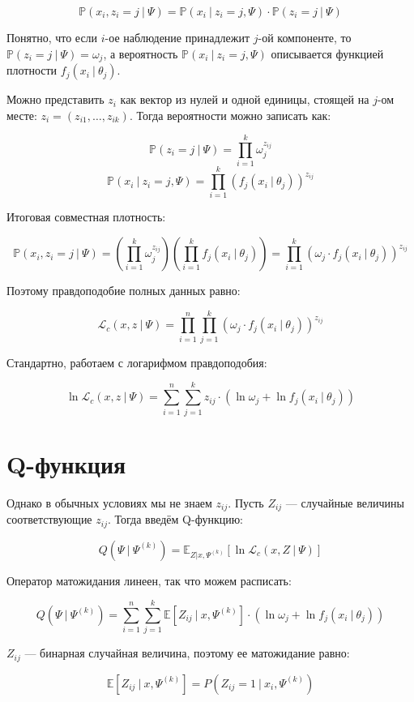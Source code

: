 \documentclass[14pt, a4paper, oneside]{memoir}
\begin{document}
\[\mathbb{P} (x_i, z_i = j ~|~ \Psi) = \mathbb{P}(x_i ~|~ z_i = j, \Psi) \cdot \mathbb{P}(z_i = j ~|~ \Psi)\]

Понятно, что если $i$-ое наблюдение принадлежит $j$-ой компоненте, то $\mathbb{P}(z_i = j ~|~ \Psi) = \omega_j$, а вероятность $\mathbb{P}(x_i~|~ z_i=j, \Psi)$ описывается функцией плотности $f_j(x_i~|~ \theta_j)$.

Можно представить $z_i$ как вектор из нулей и одной единицы, стоящей на $j$-ом месте: $z_i = (z_{i1}, \dots, z_{ik})$. Тогда вероятности можно записать как:

\[\mathbb{P}(z_i = j ~|~ \Psi) = \prod_{i=1}^k \omega_j^{z_{ij}}\]
\[\mathbb{P}(x_i ~|~ z_i = j, \Psi) = \prod_{i=1}^k (f_j(x_i ~|~ \theta_j))^{z_{ij}}\]

Итоговая совместная плотность:

\[\mathbb{P}(x_i, z_i = j ~|~ \Psi) = \left(\prod_{i=1}^k \omega_j^{z_{ij}}\right) \left(\prod_{i=1}^k f_j(x_i~|~\theta_j)\right) = \prod_{i=1}^k (\omega_j \cdot f_j(x_i~|~ \theta_j))^{z_{ij}}\]

Поэтому правдоподобие полных данных равно:

\[\mathcal{L}_c(x, z ~|~ \Psi) = \prod_{i=1}^n \prod_{j=1}^k (\omega_j \cdot f_j(x_i~|~ \theta_j))^{z_{ij}}\]

Стандартно, работаем с логарифмом правдоподобия:

\[\ln \mathcal{L}_c (x, z ~|~ \Psi) = \sum_{i=1}^n \sum_{j=1}^k z_{ij} \cdot (\ln \omega_j + \ln f_j(x_i ~|~ \theta_j))\]


\section{Q-функция}

Однако в обычных условиях мы не знаем $z_{ij}$. Пусть $Z_{ij}$ --- случайные величины соответствующие $z_{ij}$. Тогда введём Q-функцию:

\[Q(\Psi ~|~ \Psi^{(k)}) = \mathbb{E}_{Z |  x, \Psi^{(k)}}[\ln \mathcal{L}_c(x, Z ~|~ \Psi)]\]

Оператор матожидания линеен, так что можем расписать:

\[Q(\Psi ~|~ \Psi^{(k)}) = \sum_{i=1}^n \sum_{j=1}^k \mathbb{E}[Z_{ij} ~|~ x, \Psi^{(k)}] \cdot (\ln \omega_j + \ln f_j(x_i ~|~ \theta_j))\]

$Z_{ij}$ --- бинарная случайная величина, поэтому ее матожидание равно:

\[\mathbb{E}[Z_{ij} ~|~ x, \Psi^{(k)}] = P(Z_{ij} = 1 ~|~ x_i, \Psi^{(k)})\]
\end{document}
